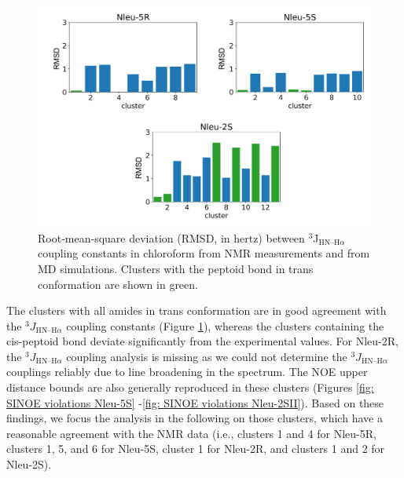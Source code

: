 \begin{figure}[h!]
    \centering
    \includegraphics[width=\textwidth]{7_chapter_5/fig/results/j3NMRConfClusterAna.png}
    \caption{ Root-mean-square deviation (RMSD, in hertz) between $^3$J$_{\text{HN–H}\alpha}$ coupling constants in chloroform from NMR measurements and from MD simulations. Clusters with the peptoid bond in trans conformation are shown in green.}
    \label{fig: j3NMRConfClusterAna}
\end{figure}


The clusters with all amides in trans conformation are in good agreement with the  $^3J_{\text{HN–H}\alpha}$ coupling constants (Figure \ref{fig: j3NMRConfClusterAna}), whereas the clusters containing the cis-peptoid bond deviate significantly from the experimental values. For Nleu-2R, the $^3J_{\text{HN–H}\alpha}$ coupling analysis is missing as we could not determine the $^3J_{\text{HN–H}\alpha}$ couplings reliably due to line broadening in the spectrum. The NOE upper distance bounds are also generally reproduced in these clusters (Figures \ref{fig: SINOE violations Nleu-5S} -\ref{fig: SINOE violations Nleu-2SII}). Based on these findings, we focus the analysis in the following on those clusters, which have a reasonable agreement with the NMR data (i.e., clusters 1 and 4 for Nleu-5R, clusters 1, 5, and 6 for Nleu-5S, cluster 1 for Nleu-2R, and clusters 1 and 2 for Nleu-2S).

